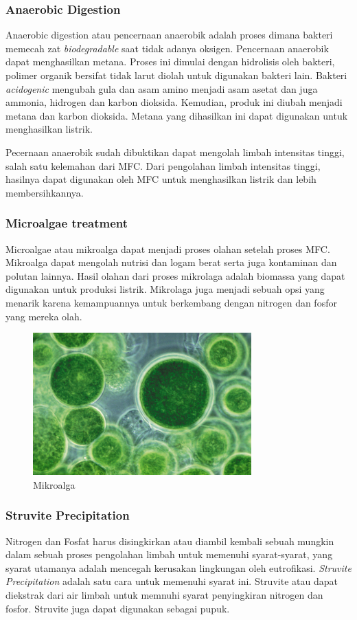 \documentclass[10pt,a4paper,hidelinks]{article}
\begin{document}
    \subsubsection{Anaerobic Digestion}
    Anaerobic digestion atau pencernaan anaerobik adalah proses dimana bakteri memecah zat \textit{biodegradable} saat tidak adanya oksigen. Pencernaan anaerobik dapat menghasilkan metana. Proses ini dimulai dengan hidrolisis oleh bakteri, polimer organik bersifat tidak larut diolah untuk digunakan bakteri lain. Bakteri \textit{acidogenic} mengubah gula dan asam amino menjadi asam asetat dan juga ammonia, hidrogen dan karbon dioksida. Kemudian, produk ini diubah menjadi metana dan karbon dioksida. Metana yang dihasilkan ini dapat digunakan untuk menghasilkan listrik.
    
Pecernaan anaerobik sudah dibuktikan dapat mengolah limbah intensitas tinggi, salah satu kelemahan dari MFC. Dari pengolahan limbah intensitas tinggi, hasilnya dapat digunakan oleh MFC untuk menghasilkan listrik dan lebih membersihkannya.
    \subsubsection{Microalgae treatment}
    Microalgae atau mikroalga dapat menjadi proses olahan setelah proses MFC. Mikroalga dapat mengolah nutrisi dan logam berat serta juga kontaminan dan polutan lainnya. Hasil olahan dari proses mikrolaga adalah biomassa yang dapat digunakan untuk produksi listrik. Mikrolaga juga menjadi sebuah opsi yang menarik karena kemampuannya untuk berkembang dengan nitrogen dan fosfor yang mereka olah.
    
	\begin{figure}[!ht]
	  \centering
		  \includegraphics[width=0.75\textwidth]{gfx/microalgae}
	  \caption{Mikroalga}
	\end{figure}

    \subsubsection{Struvite Precipitation}
    Nitrogen dan Fosfat harus disingkirkan atau diambil kembali sebuah mungkin dalam sebuah proses pengolahan limbah untuk memenuhi syarat-syarat, yang syarat utamanya adalah mencegah kerusakan lingkungan oleh eutrofikasi. \textit{Struvite Precipitation} adalah satu cara untuk memenuhi syarat ini. Struvite atau  dapat diekstrak dari air limbah untuk memnuhi syarat penyingkiran nitrogen dan fosfor. Struvite juga dapat digunakan sebagai pupuk.
\end{document}
